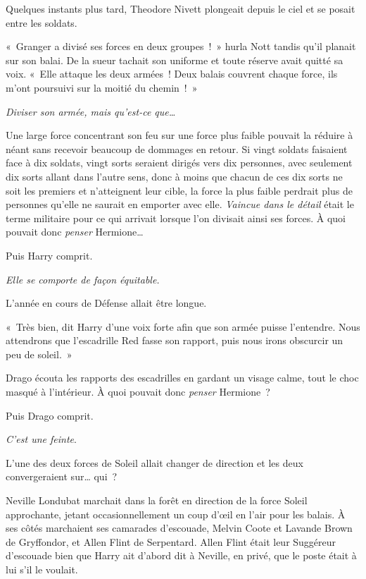 Quelques instants plus tard, Theodore Nivett plongeait depuis le ciel et se posait entre les soldats.

«~Granger a divisé ses forces en deux groupes~!~»
hurla Nott tandis qu'il planait sur son balai.
De la sueur tachait son uniforme et toute réserve avait quitté sa voix.
«~Elle attaque les deux armées~!
Deux balais couvrent chaque force, ils m'ont poursuivi sur la moitié du chemin~!~»

\emph{Diviser son armée, mais qu'est-ce que…}

Une large force concentrant son feu sur une force plus faible pouvait la réduire à néant sans recevoir beaucoup de dommages en retour.
Si vingt soldats faisaient face à dix soldats, vingt sorts seraient dirigés vers dix personnes, avec seulement dix sorts allant dans l'autre sens, donc à moins que chacun de ces dix sorts ne soit les premiers et n'atteignent leur cible, la force la plus faible perdrait plus de personnes qu'elle ne saurait en emporter avec elle.
\emph{Vaincue dans le détail} était le terme militaire pour ce qui arrivait lorsque l'on divisait ainsi ses forces.
À quoi pouvait donc \emph{penser} Hermione…

Puis Harry comprit.

\emph{Elle se comporte de façon équitable.}

L'année en cours de Défense allait être longue.

«~Très bien, dit Harry d'une voix forte afin que son armée puisse l'entendre.
Nous attendrons que l'escadrille Red fasse son rapport, puis nous irons obscurcir un peu de soleil.~»

\later

Drago écouta les rapports des escadrilles en gardant un visage calme, tout le choc masqué à l'intérieur.
À quoi pouvait donc \emph{penser} Hermione~?

Puis Drago comprit.

\emph{C'est une feinte}.

L'une des deux forces de Soleil allait changer de direction et les deux convergeraient sur… qui~?

\later

Neville Londubat marchait dans la forêt en direction de la force Soleil approchante, jetant occasionnellement un coup d'œil en l'air pour les balais.
À ses côtés marchaient ses camarades d'escouade, Melvin Coote et Lavande Brown de Gryffondor, et Allen Flint de Serpentard.
Allen Flint était leur Suggéreur d'escouade bien que Harry ait d'abord dit à Neville, en privé, que le poste était à lui s'il le voulait.

